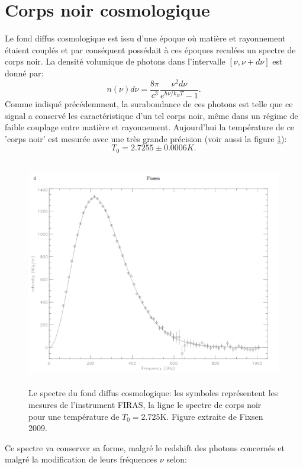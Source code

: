 \section{Corps noir cosmologique}
Le fond diffus cosmologique est issu d'une époque où matière et rayonnement étaient couplés et par conséquent possédait à ces époques reculées un spectre de corps noir. La densité volumique de photons dans l'intervalle $[\nu,\nu+d\nu]$ est donné par:
\begin{equation}
n(\nu)d\nu=\frac{8\pi}{c^3}\frac{\nu^2d\nu}{e^{h\nu/k_BT}-1}.
\end{equation}
Comme indiqué précédemment, la surabondance de ces photons est telle que ce signal a conservé les caractéristique d'un tel corps noir, même dans un régime de faible couplage entre matière et rayonnement. Aujourd'hui la température de ce 'corps noir' est mesurée avec une très grande précision  (voir aussi la figure \ref{f:bb}):
\begin{equation}
T_0=2.7255\pm0.0006 K.
\end{equation}
\begin{figure}[htbp]
	\centering
		\includegraphics[height=10cm]{figs/bb.png}
		\caption[Le spectre du fond diffus cosmologique]{Le spectre du fond diffus cosmologique: les symboles représentent les mesures de l'instrument FIRAS, la ligne le spectre de corps noir pour une température de $T_0=2.725$K. Figure extraite de Fixsen 2009.}
	\label{f:bb}
\end{figure}
Ce spectre va conserver sa forme, malgré le redshift des photons concernés et malgré la modification de leurs fréquences $\nu$ selon:
